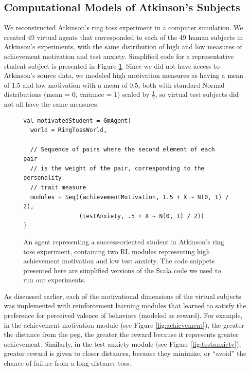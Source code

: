 \subsection{Computational Models of Atkinson's Subjects}

We reconstructed Atkinson's ring toss experiment in a computer simulation.  We created 49 virtual agents that corresponded to each of the 49 human subjects in Atkinson's experiments, with the same distribution of high and low measures of achievement motivation and test anxiety.  Simplified code for a representative student subject is presented in Figure \ref{fig:student}.  Since we did not have access to Atkinson's source data, we modeled high motivation measures as having a mean of 1.5 and low motivation with a mean of 0.5, both with standard Normal distributions (mean = 0, variance = 1) scaled by $\frac{1}{2}$, so virtual test subjects did not all have the same measures.

\begin{figure}[h]

\begin{lstlisting}
val motivatedStudent = GmAgent(
  world = RingTossWorld,

  // Sequence of pairs where the second element of each pair
  // is the weight of the pair, corresponding to the personality
  // trait measure
  modules = Seq((achievementMotivation, 1.5 + X ~ N(0, 1) / 2),
                (testAnxiety, .5 + X ~ N(0, 1) / 2))
}
\end{lstlisting}

\caption{An agent representing a success-oriented student in Atkinson's ring toss experiment, containing two RL modules representing high achievement motivation and low test anxiety.  The code snippets presented here are simplified versions of the Scala code we used to run our experiments.}
\label{fig:student}
\end{figure}

As discussed earlier, each of the motivational dimensions of the virtual subjects was implemented with reinforcement learning modules that learned to satisfy the preference for perceived valence of behaviors (modeled as reward).  For example, in the achievement motivation module (see Figure \ref{fig:achievement}), the greater the distance from the peg, the greater the reward because it represents greater achievement.  Similarly, in the test anxiety module (see Figure \ref{fig:testanxiety}), greater reward is given to closer distances, because they minimize, or ``avoid'' the chance of failure from a long-distance toss.


